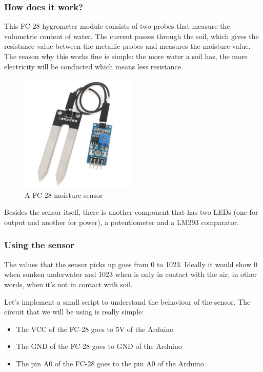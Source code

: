 \subsubsection{How does it work?}
This FC-28 hygrometer module consists of two probes that measure the volumetric content of water. The current passes through the soil, which gives the resistance value between the metallic probes and measures the moisture value. The reason why this works fine is simple: the more water a soil has, the more electricity will be conducted which means less resistance.

\begin{figure}[H]
    \centering
    \includegraphics[width=0.5\textwidth]{fig/fc28.jpg}
    \caption{A FC-28 moisture sensor}
    \label{fig:fc28}
\end{figure}

Besides the sensor itself, there is another component that has two LEDs (one for output and another for power), a potentiometer and a LM293\cite{lm293datasheet} comparator.

\subsubsection{Using the sensor}
The values that the sensor picks up goes from 0 to 1023. Ideally it would show 0 when sunken underwater and 1023 when is only in contact with the air, in other words, when it's not in contact with soil.

Let's implement a small script to understand the behaviour of the sensor. The circuit that we will be using is really simple:
\begin{itemize}
	\item The VCC of the FC-28 goes to 5V of the Arduino
	\item The GND of the FC-28 goes to GND of the Arduino
	\item The pin A0 of the FC-28 goes to the pin A0 of the Arduino
\end{itemize}

